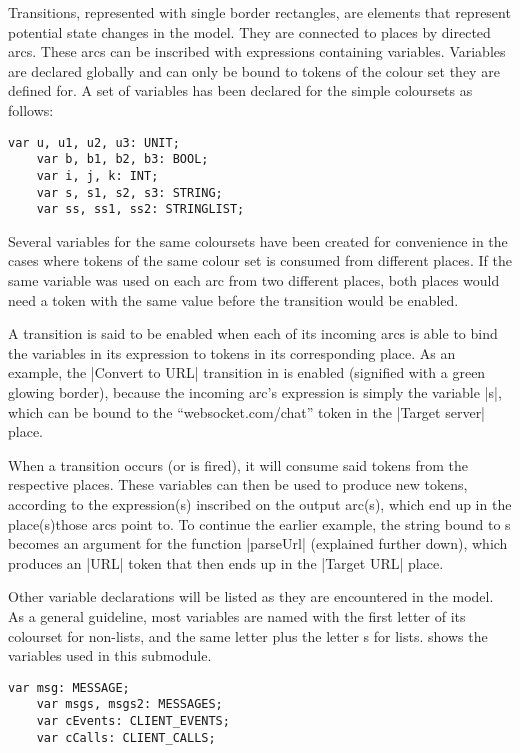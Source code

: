 	Transitions, represented with single border rectangles, are elements that
	represent potential state changes in the model. They are connected to places by
	directed arcs. These arcs can be inscribed with expressions containing
	variables. Variables are declared globally and can only be bound to tokens of
	the colour set they are defined for. A set of variables has been declared for
	the simple coloursets as follows:
	
	\begin{lstlisting}[label=lst:standard_vars,caption=Simple Colourset
	Variables,gobble=1,float=h] 
	var u, u1, u2, u3: UNIT;
	var b, b1, b2, b3: BOOL;
	var i, j, k: INT;
	var s, s1, s2, s3: STRING;
	var ss, ss1, ss2: STRINGLIST;
	\end{lstlisting}
	
	Several variables for the same coloursets have been created for convenience in
	the cases where tokens of the same colour set is consumed from different
	places.	If the same variable was used on each arc from two different places,
	both places would need a token with the same value before the transition
	would be enabled.
	
	A transition is said to be enabled when each of its incoming arcs is able to
	bind the variables in its expression to tokens in its corresponding place. As
	an example, the |Convert to URL| transition in  is enabled
	(signified with a green glowing border), because the incoming arc's expression
	is simply the variable |s|, which can be bound to the ``websocket.com/chat''
	token in the |Target server| place.
		
	When a transition occurs (or is fired), it will consume said tokens from the
	respective places. These variables can then be used to produce new tokens,
	according to the expression(s) inscribed on the output arc(s), which end up in
	the place(s)those arcs point to. To continue the earlier example, the string
	bound to s becomes an argument for the function |parseUrl| (explained further
	down), which produces an |URL| token that then ends up in the |Target URL|
	place.
	
	Other variable declarations will be listed as they are encountered in the
	model. As a general guideline, most variables are named with the first letter
	of its colourset for non-lists, and the same letter plus the letter s for
	lists.  shows the variables used in this submodule.
	
	\begin{lstlisting}[label=lst:client_app_vars,caption=Client Application
	Variables,gobble=1]
	var msg: MESSAGE;
	var msgs, msgs2: MESSAGES;
	var cEvents: CLIENT_EVENTS;
	var cCalls: CLIENT_CALLS;
	\end{lstlisting}
	
